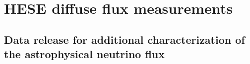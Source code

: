 \documentclass[oneside, letterpaper, 10pt, oldfontcommands]{memoir}
\begin{document}
\chapter{HESE diffuse flux measurements}
%
%
%
\section{Data release for additional characterization of the astrophysical neutrino flux\label{sec:release}}

\endgroup
\end{document}
